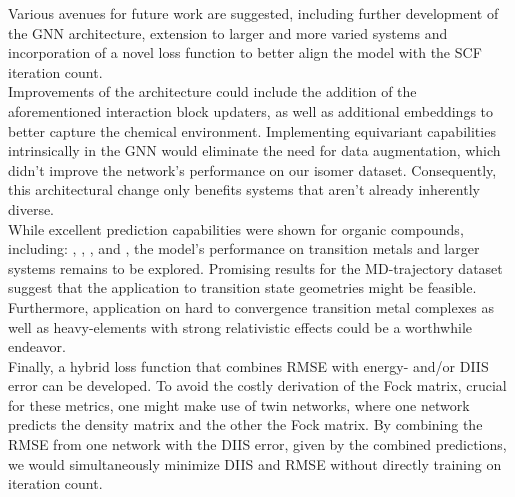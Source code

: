 Various avenues for future work are suggested, including further development of the GNN architecture, extension to larger and more varied systems and incorporation of a novel loss function to better align the model with the SCF iteration count. \\
Improvements of the architecture could include the addition of the aforementioned interaction block updaters, as well as additional embeddings to better capture the chemical environment. Implementing equivariant capabilities intrinsically in the GNN would eliminate the need for data augmentation, which didn't improve the network's performance on our isomer dataset. Consequently, this architectural change only benefits systems that aren't already inherently diverse.  \\
While excellent prediction capabilities were shown for organic compounds, including: , , ,  and , the model's performance on transition metals and larger systems remains to be explored. Promising results for the MD-trajectory dataset suggest that the application to transition state geometries might be feasible.
Furthermore, application on hard to convergence transition metal complexes as well as heavy-elements with strong relativistic effects could be a worthwhile endeavor. \\
Finally, a hybrid loss function that combines RMSE with energy- and/or DIIS error can be developed. To avoid the costly derivation of the Fock matrix, crucial for these metrics, one might make use of twin networks, where one network predicts the density matrix and the other the Fock matrix. By combining the RMSE from one network with the DIIS error, given by the combined predictions, we would simultaneously minimize DIIS and RMSE without directly training on iteration count.
